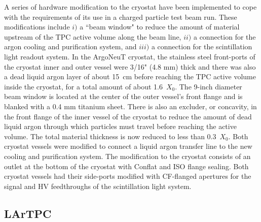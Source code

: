\documentclass[DIV=calc, paper=a4, fontsize=10pt, twocolumn]{scrartcl}	 %
\begin{document}
{A series of hardware modification to the cryostat have been implemented to cope with the requirements of its use in a  charged particle test beam run.  These modifications include $i)$ a ``beam window" to reduce the amount of material upstream of the TPC active volume along the beam line, $ii)$ a connection for the argon cooling and purification system, and $iii)$ a connection for the scintillation light readout system.  In the ArgoNeuT cryostat,  the stainless steel front-ports of the cryostat inner and outer vessel were 3/16" (4.8 mm) thick and there was also a dead liquid argon layer of about 15~cm before reaching the TPC active volume inside the cryostat, for a total amount of about 1.6~$X_0$.   The 9-inch diameter beam window is located at the center of the outer vessel's front flange and is blanked with a 0.4 mm titanium sheet. There is also an excluder, or concavity,  in the front flange of the inner vessel of the cryostat to reduce the amount of dead liquid argon through which particles must travel before reaching the active volume. The total material thickness is now reduced to less than 0.3~$X_0$. Both cryostat vessels were modified to connect a liquid argon transfer line to the new cooling and purification system. The modification to the cryostat consists of an outlet at the bottom of the cryostat with Conflat and ISO flange sealing.  Both cryostat vessels had their side-ports modified with CF-flanged apertures for the signal and HV feedthroughs of the scintillation light system.

\subsection{LArTPC}

}
\end{document}
